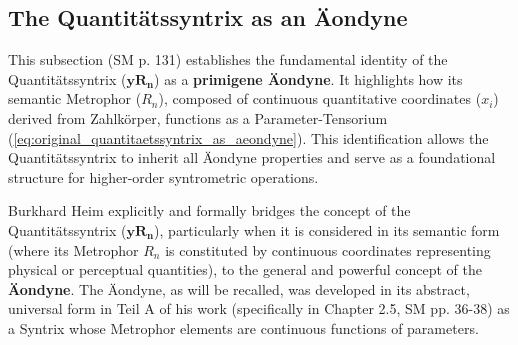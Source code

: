 \documentclass[12pt]{article}
\newcommand{\quantitaetssyntrix}{\bm{yR_n}}
\newcommand{\semantischermetrophor}{R_n}
\begin{document}
\subsection{The Quantitätssyntrix as an Äondyne}
\label{sec:quant_syntrix_as_aeondyne}

This subsection (SM p. 131) establishes the fundamental identity of the Quantitätssyntrix (\(\quantitaetssyntrix\)) as a \textbf{primigene Äondyne}. It highlights how its semantic Metrophor (\(\semantischermetrophor\)), composed of continuous quantitative coordinates (\(x_i\)) derived from Zahlkörper, functions as a Parameter-Tensorium (\eqref{eq:original_quantitaetssyntrix_as_aeondyne}). This identification allows the Quantitätssyntrix to inherit all Äondyne properties and serve as a foundational structure for higher-order syntrometric operations.

Burkhard Heim explicitly and formally bridges the concept of the Quantitätssyntrix (\(\quantitaetssyntrix\)), particularly when it is considered in its semantic form (where its Metrophor \( \semantischermetrophor \) is constituted by continuous coordinates representing physical or perceptual quantities), to the general and powerful concept of the \textbf{Äondyne}. The Äondyne, as will be recalled, was developed in its abstract, universal form in Teil A of his work (specifically in Chapter 2.5, SM pp. 36-38) as a Syntrix whose Metrophor elements are continuous functions of parameters.
\end{document}
